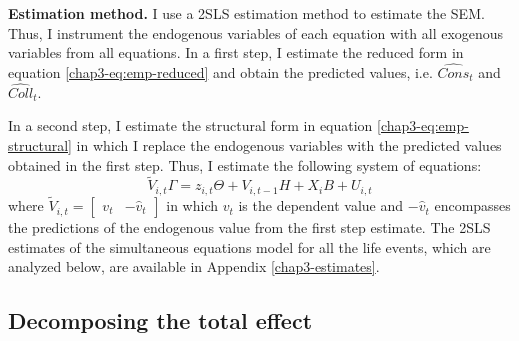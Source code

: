 \textbf{Estimation method.}
I use a 2SLS estimation method to estimate the SEM. Thus, I instrument the endogenous variables of each equation with all exogenous variables from all equations. In a first step, I estimate the reduced form in equation \eqref{chap3-eq:emp-reduced} and obtain the predicted values, i.e. $\widehat{Cons}_t$ and $\widehat{Coll}_t$. 

In a second step, I estimate the structural form in equation \eqref{chap3-eq:emp-structural} in which I replace the endogenous variables with the predicted values obtained in the first step. Thus, I estimate the following system of equations:
\begin{equation*}
    \widetilde{V}_{i,t}\Gamma = z_{i,t} \Theta + V_{i,t-1}H + X_i B + U_{i,t}
\end{equation*}
where $\widetilde{V}_{i,t} = \begin{bmatrix} v_t & -\widehat{v}_t\end{bmatrix}$ in which $v_t$ is the dependent value and $-\widehat{v}_t$ encompasses the predictions of the endogenous value from the first step estimate. The 2SLS estimates of the simultaneous equations model for all the life events, which are analyzed below, are available in Appendix \ref{chap3-estimates}.

\subsection{Decomposing the total effect}

